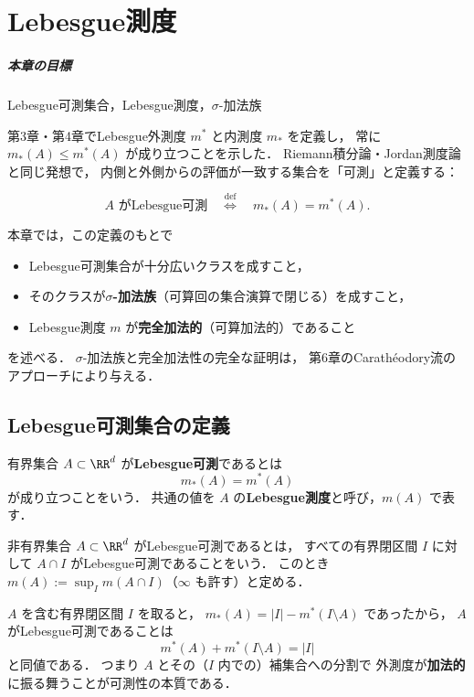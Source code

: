 \setcounter{chapter}{4}
\chapter{Lebesgue測度}\label{chap:lebesgue-measure}

\paragraph{本章の目標}
Lebesgue可測集合，Lebesgue測度，$\sigma$-加法族

第3章・第4章でLebesgue外測度 $m^*$ と内測度 $m_*$ を定義し，
常に $m_*(A) \le m^*(A)$ が成り立つことを示した．
Riemann積分論・Jordan測度論と同じ発想で，
内側と外側からの評価が一致する集合を「可測」と定義する：

\[
A \text{ がLebesgue可測}
\quad\overset{\text{def}}{\iff}\quad
m_*(A) = m^*(A).
\]

本章では，この定義のもとで
\begin{itemize}
\item Lebesgue可測集合が十分広いクラスを成すこと，
\item そのクラスが\textbf{$\sigma$-加法族}（可算回の集合演算で閉じる）を成すこと，
\item Lebesgue測度 $m$ が\textbf{完全加法的}（可算加法的）であること
\end{itemize}
を述べる．
$\sigma$-加法族と完全加法性の完全な証明は，
第6章のCarath\'eodory流のアプローチにより与える．

\section{Lebesgue可測集合の定義}\label{sec:lebesgue-measurable-def}

\begin{definition}[Lebesgue可測集合]\label{def:lebesgue-measurable}
有界集合 $A \subset \RR^d$ が\textbf{Lebesgue可測}であるとは
\[
m_*(A) = m^*(A)
\]
が成り立つことをいう．
共通の値を $A$ の\textbf{Lebesgue測度}と呼び，$m(A)$ で表す．

非有界集合 $A \subset \RR^d$ がLebesgue可測であるとは，
すべての有界閉区間 $I$ に対して
$A \cap I$ がLebesgue可測であることをいう．
このとき $m(A) := \sup_I m(A \cap I)$（$\infty$ も許す）と定める．
\end{definition}

\begin{remark}\label{rem:measurability-condition}
$A$ を含む有界閉区間 $I$ を取ると，
$m_*(A) = |I| - m^*(I \setminus A)$ であったから，
$A$ がLebesgue可測であることは
\[
m^*(A) + m^*(I \setminus A) = |I|
\]
と同値である．
つまり $A$ とその（$I$ 内での）補集合への分割で
外測度が\textbf{加法的}に振る舞うことが可測性の本質である．
\end{remark}

